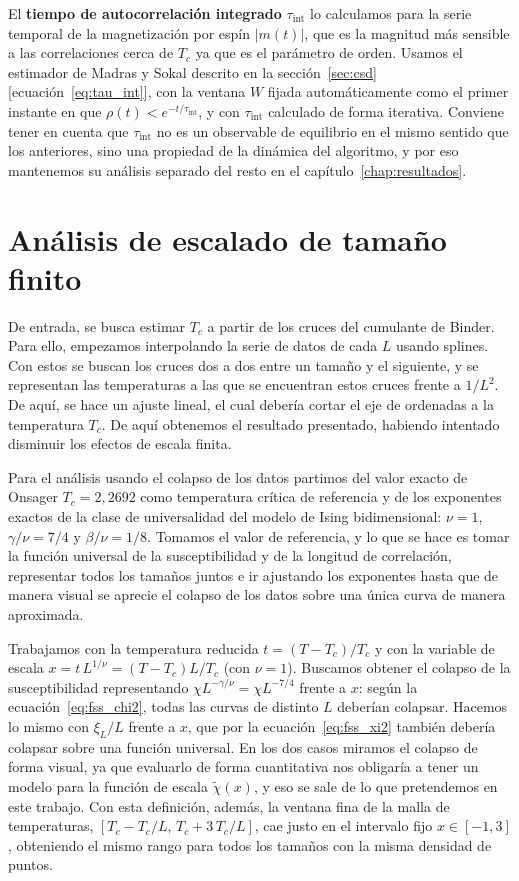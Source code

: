 El \textbf{tiempo de autocorrelación integrado} $\tau_{\text{int}}$ lo calculamos para la serie temporal de la magnetización por espín $|m(t)|$, que es la magnitud más sensible a las correlaciones cerca de $T_c$ ya que es el parámetro de orden. Usamos el estimador de Madras y Sokal descrito en la sección~\ref{sec:csd} [ecuación~\eqref{eq:tau_int}], con la ventana $W$ fijada automáticamente como el primer instante en que $\rho(t) < e^{-t/\tau_{\text{int}}}$, y con $\tau_{\text{int}}$ calculado de forma iterativa. Conviene tener en cuenta que $\tau_{\text{int}}$ no es un observable de equilibrio en el mismo sentido que los anteriores, sino una propiedad de la dinámica del algoritmo, y por eso mantenemos su análisis separado del resto en el capítulo~\ref{chap:resultados}.

\section{Análisis de escalado de tamaño finito}

De entrada, se busca estimar $T_c$ a partir de los cruces del cumulante de Binder. Para ello, empezamos interpolando la serie de datos de cada $L$ usando splines. Con estos se buscan los cruces dos a dos entre un tamaño y el siguiente, y se representan las temperaturas a las que se encuentran estos cruces frente a $1/L^2$. De aquí, se hace un ajuste lineal, el cual debería cortar el eje de ordenadas a la temperatura $T_c$. De aquí obtenemos el resultado presentado, habiendo intentado disminuir los efectos de escala finita.

Para el análisis usando el colapso de los datos partimos del valor exacto de Onsager $T_c = 2{,}2692$ como temperatura crítica de referencia y de los exponentes exactos de la clase de universalidad del modelo de Ising bidimensional: $\nu = 1$, $\gamma/\nu = 7/4$ y $\beta/\nu = 1/8$. Tomamos el valor de referencia, y lo que se hace es tomar la función universal de la susceptibilidad y de la longitud de correlación, representar todos los tamaños juntos e ir ajustando los exponentes hasta que de manera visual se aprecie el colapso de los datos sobre una única curva de manera aproximada. 

Trabajamos con la temperatura reducida $t = (T - T_c)/T_c$ y con la variable de escala $x = t\,L^{1/\nu} = (T - T_c)L/T_c$ (con $\nu = 1$). Buscamos obtener el colapso de la susceptibilidad representando $\chi L^{-\gamma/\nu} = \chi L^{-7/4}$ frente a $x$: según la ecuación~\eqref{eq:fss_chi2}, todas las curvas de distinto $L$ deberían colapsar. Hacemos lo mismo con $\xi_L/L$ frente a $x$, que por la ecuación~\eqref{eq:fss_xi2} también debería colapsar sobre una función universal. En los dos casos miramos el colapso de forma visual, ya que evaluarlo de forma cuantitativa nos obligaría a tener un modelo para la función de escala $\tilde{\chi}(x)$, y eso se sale de lo que pretendemos en este trabajo. Con esta definición, además, la ventana fina de la malla de temperaturas, $[T_c - T_c/L,\, T_c + 3\,T_c/L]$, cae justo en el intervalo fijo $x \in [-1, 3]$, obteniendo el mismo rango para todos los tamaños con la misma densidad de puntos.